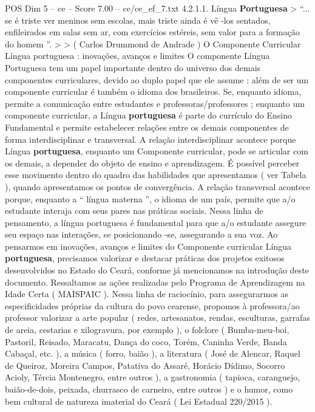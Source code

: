 \begin{textsample}{POS Dim 5 – ce – Score 7.00 – ce/ce\_ef\_7.txt}  \label{ex:f5_pos_252}
4.2.1.1.
Língua \textbf{Portuguesa} > “... se é triste ver meninos sem escolas, mais triste ainda é vê -los sentados, enfileirados em salas sem ar, com exercícios estéreis, sem valor para a formação do homem ”. > > ( Carlos Drummond de Andrade ) O Componente Curricular Língua portuguesa : inovações, avanços e limites O componente Língua Portuguesa tem um papel importante dentro do universo dos demais componentes curriculares, devido ao duplo papel que ele assume : além de ser um componente curricular é também o idioma dos brasileiros.
Se, enquanto idioma, permite a comunicação entre estudantes e professoras/professores ; enquanto um componente curricular, a Língua \textbf{portuguesa} é parte do currículo do Ensino Fundamental e permite estabelecer relações entre os demais componentes de forma interdisciplinar e transversal.
A relação interdisciplinar acontece porque Língua \textbf{portuguesa}, enquanto um Componente curricular, pode se articular com os demais, a depender do objeto de ensino e aprendizagem.
É possível perceber esse movimento dentro do quadro das habilidades que apresentamos ( ver Tabela ), quando apresentamos os pontos de convergência.
A relação transversal acontece porque, enquanto a “ língua materna ”, o idioma de um país, permite que a/o estudante interaja com seus pares nas práticas sociais.
Nessa linha de pensamento, a língua portuguesa é fundamental para que a/o estudante assegure seu espaço nas interações, se posicionando -se, assegurando a sua voz.
Ao pensarmos em inovações, avanços e limites do Componente curricular Língua \textbf{portuguesa}, precisamos valorizar e destacar práticas dos projetos exitosos desenvolvidos no Estado do Ceará, conforme já mencionamos na introdução deste documento.
Ressaltamos as ações realizadas pelo Programa de Aprendizagem na Idade Certa ( MAISPAIC ).
Nessa linha de raciocínio, para assegurarmos as especificidades próprias da cultura do povo cearense, propomos à professora/ao professor valorizar a arte popular ( redes, artesanatos, rendas, esculturas, garrafas de areia, cestarias e xilogravura, por exemplo ), o folclore ( Bumba-meu-boi, Pastoril, Reisado, Maracatu, Dança do coco, Torém, Caninha Verde, Banda Cabaçal, etc. ), a música ( forro, baião ), a literatura ( José de Alencar, Raquel de Queiroz, Moreira Campos, Patativa do Assaré, Horácio Dídimo, Socorro Acioly, Tércia Montenegro, entre outros ), a gastronomia ( tapioca, caranguejo, baião-de-dois, peixada, churrasco de carneiro, entre outros ) e o humor, como bem cultural de natureza imaterial do Ceará ( Lei Estadual 220/2015 ).

\end{textsample}
